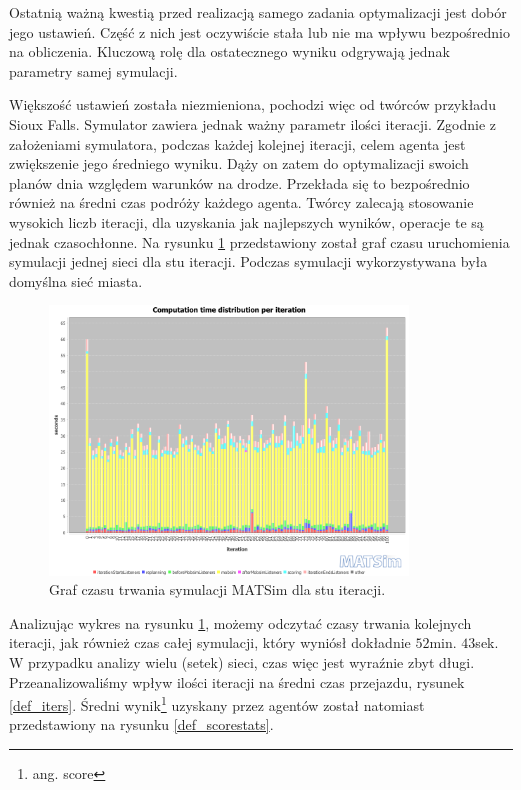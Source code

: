 \documentclass[twoside,12pt]{report}
\begin{document}
Ostatnią ważną kwestią przed realizacją samego zadania optymalizacji jest dobór jego ustawień. Część z nich jest oczywiście stała lub nie ma wpływu bezpośrednio na obliczenia. Kluczową rolę dla ostatecznego wyniku odgrywają jednak parametry samej symulacji.

Większość ustawień została niezmieniona, pochodzi więc od twórców przykładu Sioux Falls. Symulator zawiera jednak ważny parametr ilości iteracji. Zgodnie z założeniami symulatora, podczas każdej kolejnej iteracji, celem agenta jest zwiększenie jego średniego wyniku. Dąży on zatem do optymalizacji swoich planów dnia względem warunków na drodze. Przekłada się to bezpośrednio również na średni czas podróży każdego agenta. Twórcy zalecają stosowanie wysokich liczb iteracji, dla uzyskania jak najlepszych wyników, operacje te są jednak czasochłonne. Na rysunku \ref{def_stopwatch} przedstawiony został graf czasu uruchomienia symulacji jednej sieci dla stu iteracji. Podczas symulacji wykorzystywana była domyślna sieć miasta.

\begin{figure}[ht]
\centering
\includegraphics[width=0.85\textwidth]{img/def_stopwatch}
\caption{Graf czasu trwania symulacji MATSim dla stu iteracji.}
\label{def_stopwatch}
\end{figure}

Analizując wykres na rysunku \ref{def_stopwatch}, możemy odczytać czasy trwania kolejnych iteracji, jak również czas całej symulacji, który wyniósł dokładnie $52$min. $43$sek.  W przypadku analizy wielu (setek) sieci, czas więc jest wyraźnie zbyt długi. Przeanalizowaliśmy wpływ ilości iteracji na średni czas przejazdu, rysunek \ref{def_iters}. Średni wynik\footnote{ang. score} uzyskany przez agentów został natomiast przedstawiony na rysunku \ref{def_scorestats}.
\end{document}
